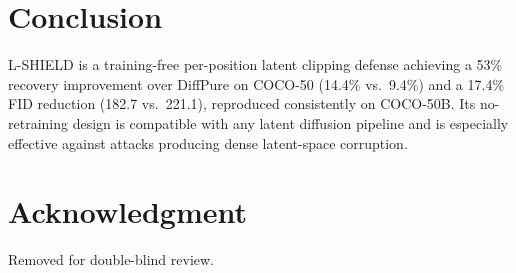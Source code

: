 \documentclass[conference]{IEEEtran}
\begin{document}
\section{Conclusion}

L-SHIELD is a training-free per-position latent clipping defense achieving
a 53\% recovery improvement over DiffPure on COCO-50 (14.4\% vs.\ 9.4\%)
and a 17.4\% FID reduction (182.7 vs.\ 221.1), reproduced consistently on
COCO-50B. Its no-retraining design is compatible with any latent diffusion
pipeline and is especially effective against attacks producing dense latent-space corruption.

\section*{Acknowledgment}
Removed for double-blind review.

\balance


\end{document}
